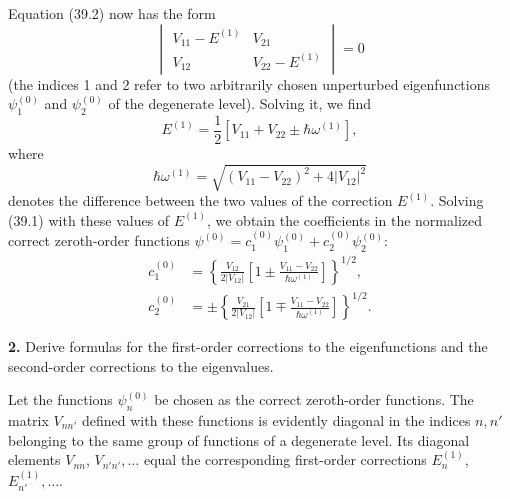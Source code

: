 \SolutionHeading Equation (39.2) now has the form
\[
  \begin{vmatrix}
   V_{11}-E^{(1)}&V_{21}\\
   V_{12}&V_{22}-E^{(1)}
  \end{vmatrix}=0
\]
(the indices 1 and 2 refer to two arbitrarily chosen unperturbed
eigenfunctions $\psi_1^{(0)}$ and $\psi_2^{(0)}$ of the degenerate level).
Solving it, we find
\begin{equation}
  E^{(1)}=\frac12[V_{11}+V_{22}\pm\hbar\omega^{(1)}],
  \tag{1}
\end{equation}
where
\[
  \hbar\omega^{(1)}=\sqrt{(V_{11}-V_{22})^2+4|V_{12}|^2}
\]
denotes the difference between the two values of the correction $E^{(1)}$.
Solving (39.1) with these values of $E^{(1)}$, we obtain the coefficients in
the normalized correct zeroth-order functions
$\psi^{(0)}=c_1^{(0)}\psi_1^{(0)}+c_2^{(0)}\psi_2^{(0)}$:
\begin{equation}
 \begin{aligned}
  c_1^{(0)}&=\left\{\frac{V_{12}}{2|V_{12}|}
    \left[1\pm\frac{V_{11}-V_{22}}{\hbar\omega^{(1)}}\right]\right\}^{1/2},\\
  c_2^{(0)}&=\pm\left\{\frac{V_{21}}{2|V_{12}|}
    \left[1\mp\frac{V_{11}-V_{22}}{\hbar\omega^{(1)}}\right]\right\}^{1/2}.
 \end{aligned}
 \tag{2}
\end{equation}

\ProblemHeading
\textbf{2.} Derive formulas for the first-order corrections to the
eigenfunctions and the second-order corrections to the eigenvalues.

\SolutionHeading Let the functions $\psi_n^{(0)}$ be chosen as the correct
zeroth-order functions. The matrix $V_{nn'}$ defined with these functions is
evidently diagonal in the indices $n,n'$ belonging to the same group of
functions of a degenerate level. Its diagonal elements $V_{nn}$,
$V_{n'n'},\ldots$ equal the corresponding first-order corrections
$E_n^{(1)}$, $E_{n'}^{(1)},\ldots$.

